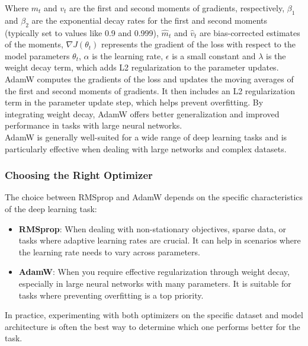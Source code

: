 Where \(m_t\) and \(v_t\) are the first and second moments of gradients, respectively, \(\beta_1\) and \(\beta_2\) are the exponential decay rates for the first and second moments (typically set to values like 0.9 and 0.999), \(\hat{m}_t\) and \(\hat{v}_t\) are bias-corrected estimates of the moments, \(\nabla J(\theta_t)\) represents the gradient of the loss with respect to the model parameters \(\theta_t\), \(\alpha\) is the learning rate, \(\epsilon\) is a small constant and \(\lambda\) is the weight decay term, which adds L2 regularization to the parameter updates. \\
AdamW computes the gradients of the loss and updates the moving averages of the first and second moments of gradients.
It then includes an L2 regularization term in the parameter update step, which helps prevent overfitting.
By integrating weight decay, AdamW offers better generalization and improved performance in tasks with large neural networks.\\

AdamW is generally well-suited for a wide range of deep learning tasks and is particularly effective when dealing with large networks and complex datasets.

\subsubsection{Choosing the Right Optimizer}

The choice between RMSprop and AdamW depends on the specific characteristics of the deep learning task:

\begin{itemize}
	\item \textbf{RMSprop}: When dealing with non-stationary objectives, sparse data, or tasks where adaptive learning rates are crucial. It can help in scenarios where the learning rate needs to vary across parameters.
	
	\item \textbf{AdamW}: When you require effective regularization through weight decay, especially in large neural networks with many parameters. It is suitable for tasks where preventing overfitting is a top priority.
\end{itemize}

In practice, experimenting with both optimizers on the specific dataset and model architecture is often the best way to determine which one performs better for the task.



